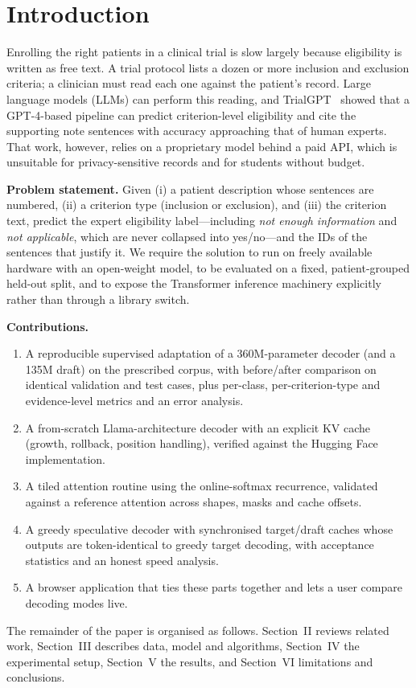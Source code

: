 \section{Introduction}
Enrolling the right patients in a clinical trial is slow largely because eligibility is written as free text. A trial protocol lists a dozen or more inclusion and exclusion criteria; a clinician must read each one against the patient's record. Large language models (LLMs) can perform this reading, and TrialGPT~\cite{jin2024trialgpt} showed that a GPT-4-based pipeline can predict criterion-level eligibility and cite the supporting note sentences with accuracy approaching that of human experts. That work, however, relies on a proprietary model behind a paid API, which is unsuitable for privacy-sensitive records and for students without budget.

\textbf{Problem statement.} Given (i) a patient description whose sentences are numbered, (ii) a criterion type (inclusion or exclusion), and (iii) the criterion text, predict the expert eligibility label---including \emph{not enough information} and \emph{not applicable}, which are never collapsed into yes/no---and the IDs of the sentences that justify it. We require the solution to run on freely available hardware with an open-weight model, to be evaluated on a fixed, patient-grouped held-out split, and to expose the Transformer inference machinery explicitly rather than through a library switch.

\textbf{Contributions.}
\begin{enumerate}
\item A reproducible supervised adaptation of a 360M-parameter decoder (and a 135M draft) on the prescribed corpus, with before/after comparison on identical validation and test cases, plus per-class, per-criterion-type and evidence-level metrics and an error analysis.
\item A from-scratch Llama-architecture decoder with an explicit KV cache (growth, rollback, position handling), verified against the Hugging Face implementation.
\item A tiled attention routine using the online-softmax recurrence, validated against a reference attention across shapes, masks and cache offsets.
\item A greedy speculative decoder with synchronised target/draft caches whose outputs are token-identical to greedy target decoding, with acceptance statistics and an honest speed analysis.
\item A browser application that ties these parts together and lets a user compare decoding modes live.
\end{enumerate}

The remainder of the paper is organised as follows. Section~II reviews related work, Section~III describes data, model and algorithms, Section~IV the experimental setup, Section~V the results, and Section~VI limitations and conclusions.
